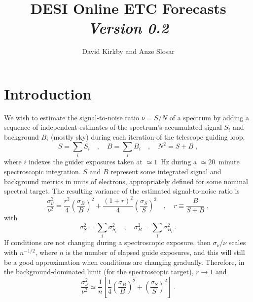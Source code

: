 \documentclass[11pt]{article}
\title{DESI Online ETC Forecasts\\
{\em\Large Version 0.2}}
\author{David Kirkby and Anze Slosar}
\begin{document}
\maketitle

\section{Introduction}

We wish to estimate the signal-to-noise ratio $\nu = S/N$ of a spectrum by adding a sequence of independent estimates of the spectrum's accumulated signal $S_i$ and background $B_i$ (mostly sky) during each iteration of the telescope guiding loop,
\begin{equation}
S = \sum_i S_i \quad, \quad B = \sum_i B_i \quad , \quad N^2 = S + B \; ,
\end{equation}
where $i$ indexes the guider exposures taken at $\simeq 1$~Hz during a $\simeq 20$~minute spectroscopic integration. $S$ and $B$ represent some integrated signal and background metrics in units of electrons, appropriately defined for some nominal spectral target. The resulting variance of the estimated signal-to-noise ratio is
\begin{equation}
\frac{\sigma_\nu^2}{\nu^2} = \frac{r^2}{4} \left(\frac{\sigma_B}{B}\right)^2 + \frac{(1+r)^2}{4} \left(\frac{\sigma_S}{S}\right)^2
\quad , \quad r \equiv \frac{B}{S+B}
\; ,
\end{equation}
with
\begin{equation}
\sigma_{S}^2 = \sum_i \sigma_{S_i}^2 \quad , \quad \sigma_{B}^2 = \sum_i \sigma_{B_i}^2 \; .
\end{equation}
If conditions are not changing during a spectroscopic exposure, then $\sigma_{\nu}/\nu$ scales with $n^{-1/2}$, where $n$ is the number of elapsed guide exposures, and this will still be a good approximation when conditions are changing gradually. Therefore, in the background-dominated limit (for the spectroscopic target), $r \rightarrow 1$ and
\begin{equation}
\frac{\sigma_\nu^2}{\nu^2} \simeq \frac{1}{n}\left[
\frac{1}{4} \left(\frac{\sigma_B}{B}\right)^2 + \left(\frac{\sigma_S}{S}\right)^2\right] \; .
\label{eqn:snr-bglim}
\end{equation}
\end{document}
